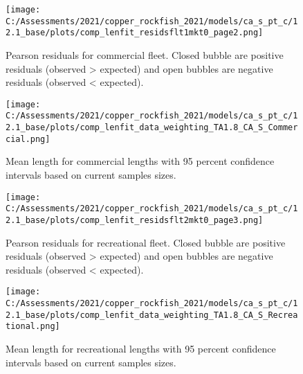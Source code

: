 \documentclass[11pt,
  english,
  a4paper,
]{article}
\begin{document}
\begin{figure}
\centering
\texttt{[image: C:/Assessments/2021/copper\_rockfish\_2021/models/ca\_s\_pt\_c/12.1\_base/plots/comp\_lenfit\_residsflt1mkt0\_page2.png]}
\caption{Pearson residuals for commercial fleet. Closed bubble are positive residuals (observed \textgreater{} expected) and open bubbles are negative residuals (observed \textless{} expected).\label{fig:com-pearson}}
\end{figure}

\tagmcend\tagstructend


\begin{figure}
\centering
\texttt{[image: C:/Assessments/2021/copper\_rockfish\_2021/models/ca\_s\_pt\_c/12.1\_base/plots/comp\_lenfit\_data\_weighting\_TA1.8\_CA\_S\_Commercial.png]}
\caption{Mean length for commercial lengths with 95 percent confidence intervals based on current samples sizes.\label{fig:com-mean-len-fit}}
\end{figure}

\tagmcend\tagstructend


\begin{figure}
\centering
\texttt{[image: C:/Assessments/2021/copper\_rockfish\_2021/models/ca\_s\_pt\_c/12.1\_base/plots/comp\_lenfit\_residsflt2mkt0\_page3.png]}
\caption{Pearson residuals for recreational fleet. Closed bubble are positive residuals (observed \textgreater{} expected) and open bubbles are negative residuals (observed \textless{} expected).\label{fig:rec-pearson}}
\end{figure}

\tagmcend\tagstructend


\begin{figure}
\centering
\texttt{[image: C:/Assessments/2021/copper\_rockfish\_2021/models/ca\_s\_pt\_c/12.1\_base/plots/comp\_lenfit\_data\_weighting\_TA1.8\_CA\_S\_Recreational.png]}
\caption{Mean length for recreational lengths with 95 percent confidence intervals based on current samples sizes.\label{fig:rec-mean-len-fit}}
\end{figure}

\tagmcend\tagstructend
\end{document}
